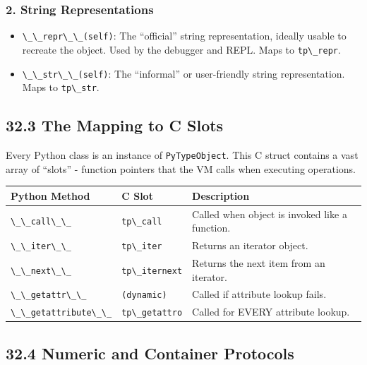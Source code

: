 \hypertarget{string-representations}{%
\subsubsection{2. String Representations}\label{string-representations}}

\begin{itemize}
\tightlist
\item
  \passthrough{\lstinline!\_\_repr\_\_(self)!}: The ``official'' string
  representation, ideally usable to recreate the object. Used by the
  debugger and REPL. Maps to \passthrough{\lstinline!tp\_repr!}.
\item
  \passthrough{\lstinline!\_\_str\_\_(self)!}: The ``informal'' or
  user-friendly string representation. Maps to
  \passthrough{\lstinline!tp\_str!}.
\end{itemize}

\hypertarget{the-mapping-to-c-slots}{%
\subsection{32.3 The Mapping to C Slots}\label{the-mapping-to-c-slots}}

Every Python class is an instance of
\passthrough{\lstinline!PyTypeObject!}. This C struct contains a vast
array of ``slots'' - function pointers that the VM calls when executing
operations.

\begin{longtable}[]{@{}lll@{}}
\toprule
Python Method & C Slot & Description \\
\midrule
\endhead
\passthrough{\lstinline!\_\_call\_\_!} &
\passthrough{\lstinline!tp\_call!} & Called when object is invoked like
a function. \\
\passthrough{\lstinline!\_\_iter\_\_!} &
\passthrough{\lstinline!tp\_iter!} & Returns an iterator object. \\
\passthrough{\lstinline!\_\_next\_\_!} &
\passthrough{\lstinline!tp\_iternext!} & Returns the next item from an
iterator. \\
\passthrough{\lstinline!\_\_getattr\_\_!} &
\passthrough{\lstinline!(dynamic)!} & Called if attribute lookup
fails. \\
\passthrough{\lstinline!\_\_getattribute\_\_!} &
\passthrough{\lstinline!tp\_getattro!} & Called for EVERY attribute
lookup. \\
\bottomrule
\end{longtable}

\hypertarget{numeric-and-container-protocols}{%
\subsection{32.4 Numeric and Container
Protocols}\label{numeric-and-container-protocols}}

